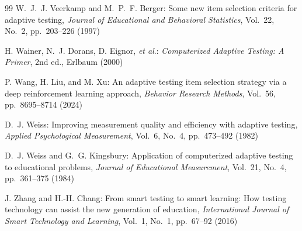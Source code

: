 \documentclass[dvipdfmx,a4j]{jarticle}
\begin{document}
\begin{thebibliography}{99}
W.~J.~J. Veerkamp and M.~P.~F. Berger:
Some new item selection criteria for adaptive testing,
\textit{Journal of Educational and Behavioral Statistics},
Vol.~22, No.~2, pp.~203--226 (1997)

H. Wainer, N.~J. Dorans, D. Eignor, \textit{et al}.:
\textit{Computerized Adaptive Testing: A Primer},
2nd ed., Erlbaum (2000)

P. Wang, H. Liu, and M. Xu:
An adaptive testing item selection strategy via a deep reinforcement learning approach,
\textit{Behavior Research Methods}, Vol.~56, pp.~8695--8714 (2024)

D.~J. Weiss:
Improving measurement quality and efficiency with adaptive testing,
\textit{Applied Psychological Measurement}, Vol.~6, No.~4, pp.~473--492 (1982)

D.~J. Weiss and G.~G. Kingsbury:
Application of computerized adaptive testing to educational problems,
\textit{Journal of Educational Measurement}, Vol.~21, No.~4, pp.~361--375 (1984)

J. Zhang and H.-H. Chang:
From smart testing to smart learning: How testing technology can assist the new generation of education,
\textit{International Journal of Smart Technology and Learning},
Vol.~1, No.~1, pp.~67--92 (2016)

\end{thebibliography}
\end{document}
